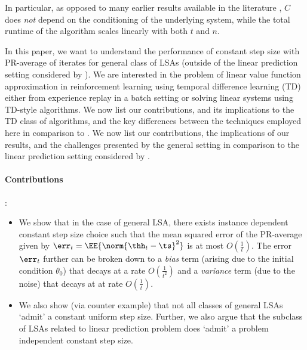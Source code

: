 In particular, as opposed to many earlier results available in the literature , $C$ does \emph{not} depend on the conditioning of the underlying system, while the total runtime of the algorithm scales linearly with both $t$ and $n$.\par
In this paper, we want to understand the performance of constant step size with PR-average of iterates for general class of LSAs (outside of the linear prediction setting considered by \cite{bach}). We are interested in the problem of linear value function approximation in reinforcement learning using temporal difference learning (TD) either from experience replay in a batch setting or solving linear systems using TD-style algorithms.
  We now list our contributions, and its implications to the TD class of algorithms, and the key differences between the techniques employed here in comparison to \cite{bach}. We now list our contributions, the implications of our results, and the challenges presented by the general setting in comparison to the linear prediction setting considered by \cite{bach}.
\paragraph{Contributions}:
\begin{itemize}[leftmargin=*, before = \leavevmode\vspace{-\baselineskip}]
\item We show that in the case of general LSA, there exists instance dependent constant step size choice such that the mean squared error of the PR-average given by $\err_t=\EE{\norm{\thh_t-\ts}^2}$ is at most $O(\frac{1}{t})$. The error $\err_t$ further can be broken down to a \emph{bias} term (arising due to the initial condition $\theta_0$) that decays at a rate $O(\frac{1}{t^2})$ and a \emph{variance} term (due to the noise) that decays at at rate $O(\frac{1}{t})$.
\item We also show (via counter example) that not all classes of general LSAs `admit' a constant uniform step size. Further, we also argue that the subclass of LSAs related to linear prediction problem does `admit' a problem independent constant step size.
\end{itemize}
